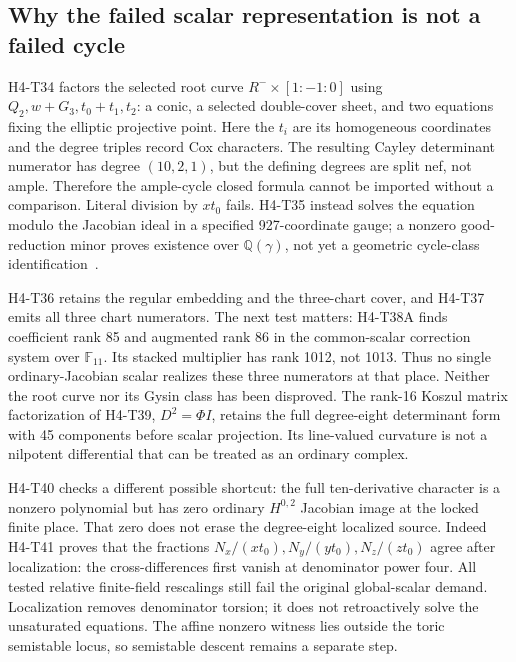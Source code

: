 \documentclass[11pt]{article}
\theoremstyle{definition}
\theoremstyle{remark}
\begin{document}
\subsection{Why the failed scalar representation is not a failed cycle}
\label{sec:root-charts}

H4-T34 factors the selected root curve
\(R^-\times[1:-1:0]\) using
\(Q_2,w+G_3,t_0+t_1,t_2\): a conic, a selected double-cover sheet,
and two equations fixing the elliptic projective point. Here the \(t_i\)
are its homogeneous coordinates and the degree triples record Cox
characters. The resulting Cayley determinant numerator
has degree \((10,2,1)\), but the defining degrees are split nef, not
ample. Therefore the ample-cycle closed formula cannot be imported without
a comparison. Literal division by \(xt_0\) fails. H4-T35 instead solves
the equation modulo the Jacobian ideal in a specified 927-coordinate gauge;
a nonzero good-reduction minor proves existence over \(\mathbb Q(\gamma)\),
not yet a geometric cycle-class identification~\cite{FluxRootCharts}.

H4-T36 retains the regular embedding and the three-chart cover, and H4-T37
emits all three chart numerators. The next test matters: H4-T38A finds
coefficient rank 85 and augmented rank 86 in the common-scalar correction
system over \(\mathbb F_{11}\). Its stacked multiplier has rank 1012,
not 1013. Thus no single ordinary-Jacobian scalar realizes these three
numerators at that place. Neither the root curve nor its Gysin class has
been disproved. The rank-16 Koszul matrix factorization of H4-T39,
\(D^2=\Phi I\), retains the full degree-eight determinant form with
45 components before scalar projection. Its line-valued curvature is not
a nilpotent differential that can be treated as an ordinary complex.

H4-T40 checks a different possible shortcut: the full ten-derivative
character is a nonzero polynomial but has zero ordinary \(H^{0,2}\)
Jacobian image at the locked finite place. That zero does not erase the
degree-eight localized source. Indeed H4-T41 proves that the fractions
\(N_x/(xt_0),N_y/(yt_0),N_z/(zt_0)\) agree after localization: the
cross-differences first vanish at denominator power four. All tested
relative finite-field rescalings still fail the original global-scalar
demand. Localization removes denominator torsion; it does not retroactively
solve the unsaturated equations. The affine nonzero witness lies outside
the toric semistable locus, so semistable descent remains a separate step.
\end{document}
